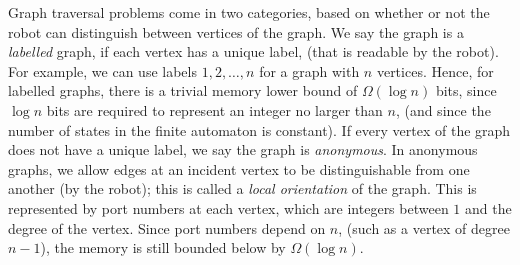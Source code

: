 \documentclass[12pt,letterpaper,oneside]{book}
\begin{document}
Graph traversal problems come in two categories, based on whether or not the robot can distinguish between vertices of the graph.  
We say the graph is a \emph{labelled} graph, 
if each vertex has a unique label, (that is readable by the robot).   For example, 
we can use labels $1,2,\ldots,n$ for a graph with $n$ vertices.  
Hence, for labelled graphs, there is a trivial memory lower bound of $\Omega(\log n)$ bits, 
since $\log n$ bits are required to represent an integer no larger than $n$, (and since the number of states in the finite 
automaton is constant).  If every vertex of the graph 
does not have a unique label, we say the graph is \emph{anonymous}.  
In anonymous graphs, we allow edges at an incident vertex to be distinguishable from one another (by the robot); this is  
called a \emph{local orientation} of the graph.  This is represented by port numbers at each vertex, which 
are integers between $1$ and the 
degree of the vertex.  Since port numbers depend on 
$n$, (such as a vertex of degree $n-1$), the memory is still bounded below by $\Omega(\log n)$.  






\end{document}
